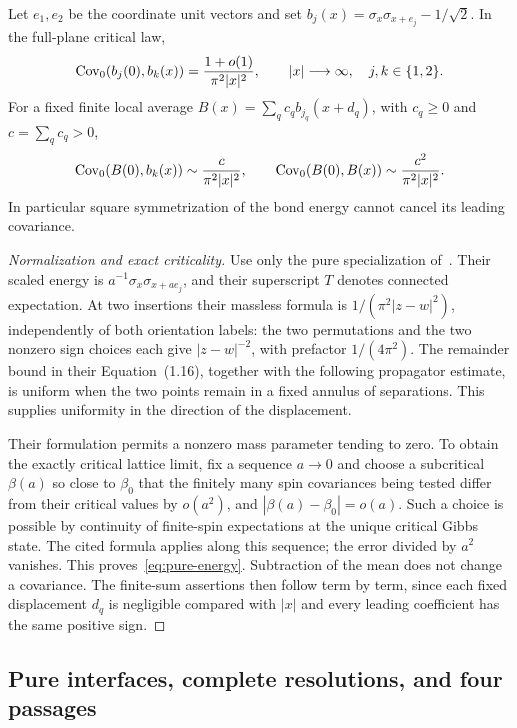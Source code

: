 \begin{proposition}
\label{prop:energy}
Let \(e_1,e_2\) be the coordinate unit vectors and set
\(b_j(x)=\sigma_x\sigma_{x+e_j}-1/\sqrt2\). In the full-plane
critical law,
\begin{equation}
 \operatorname{Cov}_0(b_j(0),b_k(x))
   =\frac{1+o(1)}{\pi^2|x|^2},\qquad |x|\longrightarrow\infty,
 \quad j,k\in\{1,2\}.
 \label{eq:pure-energy}
\end{equation}
For a fixed finite local average
\(B(x)=\sum_qc_qb_{j_q}(x+d_q)\), with \(c_q\ge0\) and
\(c=\sum_qc_q>0\),
\[
 \operatorname{Cov}_0(B(0),b_k(x))\sim\frac{c}{\pi^2|x|^2},\qquad
 \operatorname{Cov}_0(B(0),B(x))\sim\frac{c^2}{\pi^2|x|^2}.
\]
In particular square symmetrization of the bond energy cannot cancel
its leading covariance.
\end{proposition}

\begin{proof}[Normalization and exact criticality]
Use only the pure specialization of~\cite[Equations~(1.8), (1.11),
and Theorem~1.2]{GGM2012}. Their scaled energy is
\(a^{-1}\sigma_x\sigma_{x+ae_j}\), and their superscript \(T\)
denotes connected expectation. At two insertions their massless
formula is \(1/(\pi^2|z-w|^2)\), independently of both orientation
labels: the two permutations and the two nonzero sign choices each
give \(|z-w|^{-2}\), with prefactor \(1/(4\pi^2)\).
The remainder bound in their Equation~(1.16), together with the
following propagator estimate, is uniform when the two points remain
in a fixed annulus of separations. This supplies uniformity in the
direction of the displacement.

Their formulation permits a nonzero mass parameter tending to zero.
To obtain the exactly critical lattice limit, fix a sequence \(a\to0\)
and choose a subcritical \(\beta(a)\) so close to \(\beta_0\) that
the finitely many spin covariances being tested differ from their
critical values by \(o(a^2)\), and
\(|\beta(a)-\beta_0|=o(a)\). Such a choice is possible by continuity
of finite-spin expectations at the unique critical Gibbs state.
The cited formula applies along this sequence; the error divided by
\(a^2\) vanishes. This proves~\eqref{eq:pure-energy}. Subtraction of
the mean does not change a covariance. The finite-sum assertions then
follow term by term, since each fixed displacement \(d_q\) is
negligible compared with \(|x|\) and every leading coefficient has
the same positive sign.
\end{proof}

\subsection{Pure interfaces, complete resolutions, and four passages}

